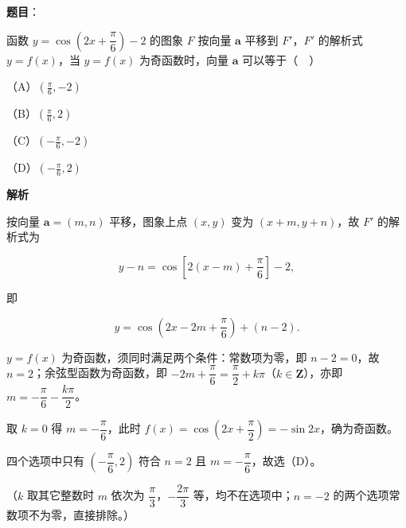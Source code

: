 \begin{answer}

\textbf{题目}：

函数 $y=\cos\left(2x+\dfrac\pi6\right)-2$ 的图象 $F$ 按向量 $\boldsymbol a$ 平移到 $F'$，$F'$ 的解析式 $y=f(x)$，当 $y=f(x)$ 为奇函数时，向量 $\boldsymbol a$ 可以等于（　）

（A）$\left(\frac\pi6,-2\right)$

（B）$\left(\frac\pi6,2\right)$

（C）$\left(-\frac\pi6,-2\right)$

（D）$\left(-\frac\pi6,2\right)$

\textbf{解析}

按向量 $\boldsymbol a=(m,n)$ 平移，图象上点 $(x,y)$ 变为 $(x+m,y+n)$，故 $F'$ 的解析式为

\nopagebreak[4]
\[y-n=\cos\left[2(x-m)+\frac\pi6\right]-2,\]

即

\nopagebreak[4]
\[y=\cos\left(2x-2m+\frac\pi6\right)+(n-2).\]

$y=f(x)$ 为奇函数，须同时满足两个条件：常数项为零，即 $n-2=0$，故 $n=2$；余弦型函数为奇函数，即 $-2m+\dfrac\pi6=\dfrac\pi2+k\pi$（$k\in\mathbf Z$），亦即 $m=-\dfrac\pi6-\dfrac{k\pi}{2}$。

取 $k=0$ 得 $m=-\dfrac\pi6$，此时 $f(x)=\cos\left(2x+\dfrac\pi2\right)=-\sin2x$，确为奇函数。

四个选项中只有 $\left(-\dfrac\pi6,2\right)$ 符合 $n=2$ 且 $m=-\dfrac\pi6$，故选（D）。

（$k$ 取其它整数时 $m$ 依次为 $\dfrac\pi3$，$-\dfrac{2\pi}3$ 等，均不在选项中；$n=-2$ 的两个选项常数项不为零，直接排除。）


\end{answer}
